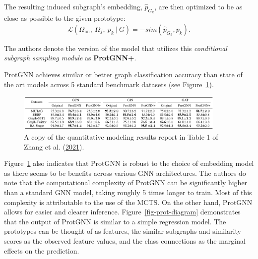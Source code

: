 \documentclass[
  11pt,
  letterpaper,
]{article}
\begin{document}
The resulting induced subgraph's embedding, \(\hat p_{G_k}\), are then
optimized to be as close as possible to the given prototype:
\begin{equation}
    \mathcal{L}(\Omega_{\text{nn}}, \ \Omega_f, \ p_k \ | \ G) = - sim(\hat p_{G_k}, p_k). 
\end{equation}

The authors denote the version of the model that utilizes this
\emph{conditional subgraph sampling module} as \textbf{ProtGNN+}.

\quad ProtGNN achieves similar or better graph classification accuracy
than state of the art models across 5 standard benchmark datasets (see
Figure~\ref{fig-prot-acc-table}).

\begin{figure}

{\centering \includegraphics[width=0.9\textwidth,height=\textheight]{figures/prot_acc_table.png}

}

\caption{\label{fig-prot-acc-table}A copy of the quantitative modeling
results report in Table 1 of Zhang et al.
(\protect\hyperlink{ref-Zhang_Liu_Wang_Lu_Lee_2021}{2021}).}

\end{figure}

Figure~\ref{fig-prot-acc-table} also indicates that ProtGNN is robust to
the choice of embedding model as there seems to be benefits across
various GNN architectures. The authors do note that the computational
complexity of ProtGNN can be significantly higher than a standard GNN
model, taking roughly 5 times longer to train. Most of this complexity
is attributable to the use of the MCTS. On the other hand, ProtGNN
allows for easier and clearer inference. Figure~\ref{fig-prot-diagram}
demonstrates that the output of ProtGNN is similar to a simple
regression model. The prototypes can be thought of as features, the
similar subgraphs and similarity scores as the observed feature values,
and the class connections as the marginal effects on the prediction.
\end{document}
